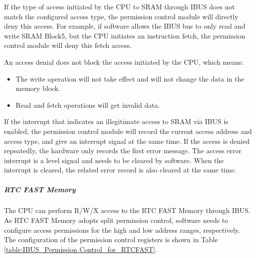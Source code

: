 \documentclass[main\_\_EN.tex]{subfiles}
\begin{document}
If the type of access initiated by the CPU to SRAM through IBUS does not match the configured access type, the permission control module will directly deny this access. For example, if software allows the IBUS bus to only read and write SRAM Block5, but the CPU initiates an instruction fetch, the permission control module will deny this fetch access.

An access denial does not block the access initiated by the CPU, which means:

\begin{itemize}
    \item The write operation will not take effect and will not change the data in the memory block.
    \item Read and fetch operations will get invalid data.
\end{itemize}

If the interrupt that indicates an illegitimate access to SRAM via IBUS is enabled, the permission control module will record the current access address and access type, and give an interrupt signal at the same time. If the access is denied repeatedly, the hardware only records the first error message. The access error interrupt is a level signal and needs to be cleared by software. When the interrupt is cleared, the related error record is also cleared at the same time.

\subparagraph{ RTC FAST Memory}
The CPU can perform R/W/X access to the RTC FAST Memory through IBUS. As RTC FAST Memory adopts split permission control, software needs to configure access permissions for the high and low address ranges, respectively. The configuration of the permission control registers is shown in Table \ref{table:IBUS_Permission Control_for_RTCFAST}.
\end{document}
